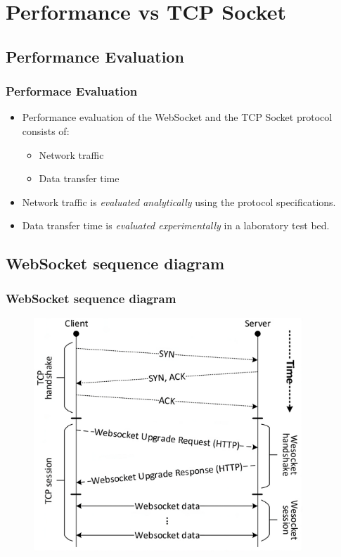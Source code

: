 \documentclass{beamer}
\begin{document}
\section{Performance vs TCP Socket}
\subsection{Performance Evaluation}
\begin{frame}
    \frametitle{Performace Evaluation}
    \begin{itemize}[<+->]
        \item Performance evaluation of the WebSocket and the TCP Socket protocol consists
              of:
              \begin{itemize}[<+->]
                  \item Network traffic
                  \item Data transfer time
              \end{itemize}
        \item Network traffic is \textit{evaluated analytically} using the protocol
              specifications.
        \item Data transfer time is \textit{evaluated experimentally} in a laboratory test
              bed.
    \end{itemize}
\end{frame}

\subsection{WebSocket sequence diagram}
\begin{frame}[label=ws_seq_diag]
    \frametitle{WebSocket sequence diagram}
    \begin{figure}
        \includegraphics[width=0.9\textwidth]{images/websocket_seq_diagram.jpeg}
    \end{figure}
\end{frame}
\end{document}
